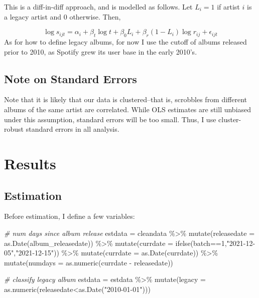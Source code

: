 \documentclass[
  11pt,
]{article}
\newenvironment{Shaded}{\begin{snugshade}}{\end{snugshade}}
\newcommand{\AttributeTok}[1]{\textcolor[rgb]{0.77,0.63,0.00}{#1}}
\newcommand{\CommentTok}[1]{\textcolor[rgb]{0.56,0.35,0.01}{\textit{#1}}}
\newcommand{\DecValTok}[1]{\textcolor[rgb]{0.00,0.00,0.81}{#1}}
\newcommand{\FunctionTok}[1]{\textcolor[rgb]{0.00,0.00,0.00}{#1}}
\newcommand{\NormalTok}[1]{#1}
\newcommand{\OtherTok}[1]{\textcolor[rgb]{0.56,0.35,0.01}{#1}}
\newcommand{\SpecialCharTok}[1]{\textcolor[rgb]{0.00,0.00,0.00}{#1}}
\newcommand{\StringTok}[1]{\textcolor[rgb]{0.31,0.60,0.02}{#1}}
\begin{document}
This is a diff-in-diff approach, and is modelled as follows. Let
\(L_i=1\) if artist \(i\) is a legacy artist and 0 otherwise. Then,

\[\log s_{ijt} = \alpha_i + \beta_t \log t + \beta_0 L_i + \beta_r (1-L_i) \log r_{ij} + \epsilon_{ijt}\]
As for how to define legacy albums, for now I use the cutoff of albums
released prior to 2010, as Spotify grew its user base in the early
2010's.

\hypertarget{note-on-standard-errors}{%
\subsection{Note on Standard Errors}\label{note-on-standard-errors}}

Note that it is likely that our data is clustered--that is, scrobbles
from different albums of the same artist are correlated. While OLS
estimates are still unbiased under this assumption, standard errors will
be too small. Thus, I use cluster-robust standard errors in all
analysis.

\hypertarget{results}{%
\section{Results}\label{results}}

\hypertarget{estimation}{%
\subsection{Estimation}\label{estimation}}

Before estimation, I define a few variables:

\begin{Shaded}
\begin{Highlighting}[]
\CommentTok{\# num days since album release}
\NormalTok{estdata }\OtherTok{=}\NormalTok{ cleandata }\SpecialCharTok{\%\textgreater{}\%}
  \FunctionTok{mutate}\NormalTok{(}\AttributeTok{releasedate =} \FunctionTok{as.Date}\NormalTok{(album\_releasedate)) }\SpecialCharTok{\%\textgreater{}\%}
  \FunctionTok{mutate}\NormalTok{(}\AttributeTok{currdate =} \FunctionTok{ifelse}\NormalTok{(batch}\SpecialCharTok{==}\DecValTok{1}\NormalTok{,}\StringTok{"2021{-}12{-}05"}\NormalTok{,}\StringTok{"2021{-}12{-}15"}\NormalTok{)) }\SpecialCharTok{\%\textgreater{}\%}
  \FunctionTok{mutate}\NormalTok{(}\AttributeTok{currdate =} \FunctionTok{as.Date}\NormalTok{(currdate)) }\SpecialCharTok{\%\textgreater{}\%}
  \FunctionTok{mutate}\NormalTok{(}\AttributeTok{numdays =} \FunctionTok{as.numeric}\NormalTok{(currdate }\SpecialCharTok{{-}}\NormalTok{ releasedate))}

\CommentTok{\# classify legacy album}
\NormalTok{estdata }\OtherTok{=}\NormalTok{ estdata }\SpecialCharTok{\%\textgreater{}\%}
  \FunctionTok{mutate}\NormalTok{(}\AttributeTok{legacy =} \FunctionTok{as.numeric}\NormalTok{(releasedate}\SpecialCharTok{\textless{}}\FunctionTok{as.Date}\NormalTok{(}\StringTok{"2010{-}01{-}01"}\NormalTok{)))}
\end{Highlighting}
\end{Shaded}
\end{document}

